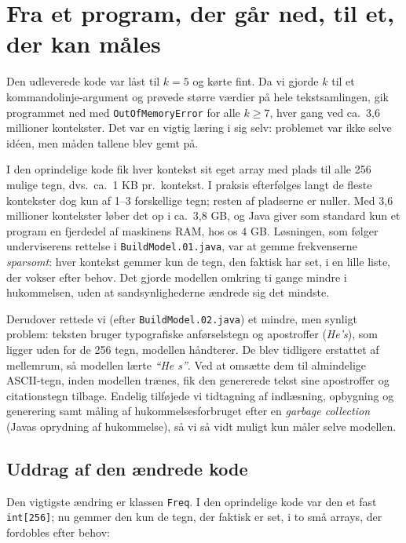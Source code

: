 \documentclass[11pt,a4paper]{article}
\begin{document}
\section{Fra et program, der går ned, til et, der kan måles}

Den udleverede kode var låst til $k=5$ og kørte fint. Da vi gjorde $k$ til et
kommandolinje-argument og prøvede større værdier på hele tekstsamlingen, gik
programmet ned med \texttt{OutOfMemoryError} for alle $k \geq 7$, hver gang ved
ca.\ 3{,}6 millioner kontekster. Det var en vigtig læring i sig selv: problemet var
ikke selve idéen, men måden tallene blev gemt på.

I den oprindelige kode fik hver kontekst sit eget array med plads til alle 256
mulige tegn, dvs.\ ca.\ 1 KB pr.\ kontekst. I praksis efterfølges langt de fleste
kontekster dog kun af 1--3 forskellige tegn; resten af pladserne er nuller. Med
3{,}6 millioner kontekster løber det op i ca.\ 3{,}8 GB, og Java giver som standard
kun et program en fjerdedel af maskinens RAM, hos os 4 GB. Løsningen, som følger
underviserens rettelse i \texttt{BuildModel.01.java}, var at gemme frekvenserne
\emph{sparsomt}: hver kontekst gemmer kun de tegn, den faktisk har set, i en lille
liste, der vokser efter behov. Det gjorde modellen omkring ti gange mindre i
hukommelsen, uden at sandsynlighederne ændrede sig det mindste.

Derudover rettede vi (efter \texttt{BuildModel.02.java}) et mindre, men synligt
problem: teksten bruger typografiske anførselstegn og apostroffer (\textit{He’s}),
som ligger uden for de 256 tegn, modellen håndterer. De blev tidligere erstattet af
mellemrum, så modellen lærte \textit{``He s''}. Ved at omsætte dem til almindelige
ASCII-tegn, inden modellen trænes, fik den genererede tekst sine apostroffer og
citationstegn tilbage. Endelig tilføjede vi tidtagning af indlæsning, opbygning og
generering samt måling af hukommelsesforbruget efter en \emph{garbage collection}
(Javas oprydning af hukommelse), så vi så vidt muligt kun måler selve modellen.

\subsection{Uddrag af den ændrede kode}

Den vigtigste ændring er klassen \texttt{Freq}. I den oprindelige kode var den et
fast \texttt{int[256]}; nu gemmer den kun de tegn, der faktisk er set, i to små
arrays, der fordobles efter behov:
\end{document}
